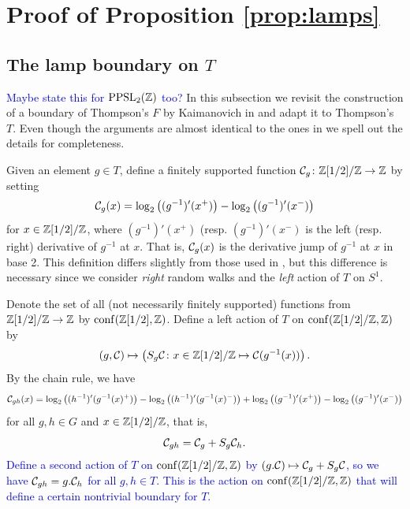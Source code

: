 \section{Proof of Proposition \ref{prop:lamps}}
\subsection{The lamp boundary on $T$} \textcolor{blue}{Maybe state this for $\mathrm{PPSL_2}({\mathbb Z})$ too?} %
In this subsection we revisit the construction of a boundary of Thompson's $F$ by Kaimanovich in \cite{Kaimanovich2017} and adapt it to Thompson's $T$. Even though the arguments are almost identical to the ones in \cite{Kaimanovich2017, Stankov2021} we spell out the details for completeness.%

Given an element $g \in T$, define a finitely supported function ${\mathcal C}_g \colon {\mathbb Z}[1/2]/{\mathbb Z} \to {\mathbb Z}$ by setting 
\[
{\mathcal C}_g(x) = \log_2\left((g^{-1})'(x^+)\right) - \log_2\left((g^{-1})'(x^-)\right)
\]for $x \in {\mathbb Z}[1/2]/{\mathbb Z}$, where $(g^{-1})'(x^+)$ (resp. $(g^{-1})'(x^-)$ is the left (resp. right) derivative of $g^{-1}$ at $x$. That is, ${\mathcal C}_g(x)$ is the derivative jump of $g^{-1}$ at $x$ in base 2. This definition differs slightly from those used in \cite{Kaimanovich2017, Stankov2021}, but this difference is necessary since we consider \emph{right} random walks and the \emph{left} action of $T$ on $S^1$.

Denote the set of all (not necessarily finitely supported) functions from ${\mathbb Z}[1/2]/{\mathbb Z} \to {\mathbb Z}$ by $\mathrm{conf}({\mathbb Z}[1/2], {\mathbb Z})$. %
Define a left action of $T$ on $\mathrm{conf}({\mathbb Z}[1/2]/{\mathbb Z}, {\mathbb Z})$ by
\[
(g, {\mathcal C}) \mapsto \left(S_g {\mathcal C} \colon x \in {\mathbb Z}[1/2]/{\mathbb Z} \mapsto {\mathcal C}(g^{-1}(x))\right).
\] By the chain rule, we have
\[
{\mathcal C}_{gh}(x) = \log_2\left((h^{-1})'(g^{-1}(x)^+)\right) - \log_2\left((h^{-1})'(g^{-1}(x)^-)\right) + \log_2\left((g^{-1})'(x^+)\right) - \log_2\left((g^{-1})'(x^-)\right)
\]for all $g,h \in G$ and $x \in {\mathbb Z}[1/2]/{\mathbb Z}$, that is, 
\[
{\mathcal C}_{gh} = {\mathcal C}_g + S_g{\mathcal C}_h.
\]
\textcolor{blue}{Define a second action of $T$ on $\mathrm{conf}({\mathbb Z}[1/2]/{\mathbb Z}, {\mathbb Z})$ by $(g.{\mathcal C}) \mapsto {\mathcal C}_g + S_g{\mathcal C}$, so we have ${\mathcal C}_{gh} = g.{\mathcal C}_h$ for all $g,h \in T$. This is the action on $\mathrm{conf}({\mathbb Z}[1/2]/{\mathbb Z}, {\mathbb Z})$ that will define a certain nontrivial boundary for $T$.}

